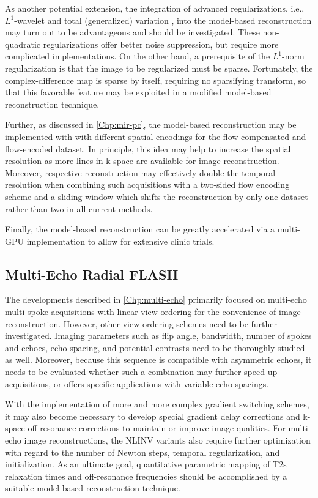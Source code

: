 As another potential extension, the integration of advanced regularizations, i.e., $L^1$-wavelet \cite{2008_NLINV_L1} and total (generalized) variation \cite{2012_NLINV_TGV}, into the model-based reconstruction may turn out to be advantageous and should be investigated. These non-quadratic regularizations offer better noise suppression, but require more complicated implementations. On the other hand, a prerequisite of the $L^1$-norm regularization is that the image to be regularized must be sparse. Fortunately, the complex-difference map is sparse by itself, requiring no sparsifying transform, so that this favorable feature may be exploited in a modified model-based reconstruction technique.

Further, as discussed in \cref{Chp:mir-pc}, the model-based reconstruction may be implemented with with different spatial encodings for the flow-compensated and flow-encoded dataset. In principle, this idea may help to increase the spatial resolution as more lines in k-space are available for image reconstruction. Moreover, respective reconstruction may effectively double the temporal resolution when combining such acquisitions with a two-sided flow encoding scheme and a sliding window which shifts the reconstruction by only one dataset rather than two in all current methods.

Finally, the model-based reconstruction can be greatly accelerated via a multi-\acs{GPU} implementation to allow for extensive clinic trials. 

\subsection*{Multi-Echo Radial FLASH}
The developments described in \cref{Chp:multi-echo} primarily focused on multi-echo multi-spoke acquisitions with linear view ordering for the convenience of image reconstruction. However, other view-ordering schemes need to be further investigated. Imaging parameters such as flip angle, bandwidth, number of spokes and echoes, echo spacing, and potential contrasts need to be thoroughly studied as well. Moreover, because this sequence is compatible with asymmetric echoes, it needs to be evaluated whether such a combination may further speed up acquisitions, or offers specific applications with variable echo spacings. 

With the implementation of more and more complex gradient switching schemes, it may also become necessary to develop special gradient delay corrections and k-space off-resonance corrections to maintain or improve image qualities. For multi-echo image reconstructions, the NLINV variants also require further optimization with regard to the number of Newton steps, temporal regularization, and initialization. As an ultimate goal, quantitative parametric mapping of \acs{T2s} relaxation times and off-resonance frequencies should be accomplished by a suitable model-based reconstruction technique. 

